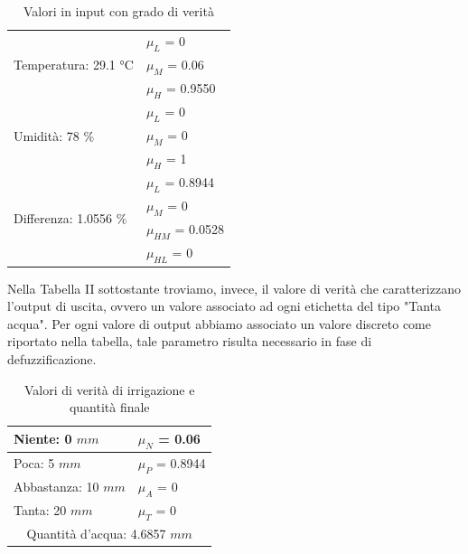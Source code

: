 \documentclass[conference,10pt]{IEEEtran}
\begin{document}
\begin{table}[ht]
	\centering
	\caption{Valori in input con grado di verità}
	{\renewcommand\arraystretch{1.7}
	\begin{tabular}{|l|l|}\hline
		\multirow{3}{*}{Temperatura: 29.1 °C}  & $\mu_{L}$ = 0 \\ \cline{2-2} &  $\mu_{M}$ = 0.06 \\ \cline{2-2}  &  $\mu_{H}$ = 0.9550 \\ \cline{2-2}
		\hline
		\multirow{3}{*}{Umidità: 78 $\%$}  & $\mu_{L}$ = 0 \\ \cline{2-2} &  $\mu_{M}$ = 0 \\ \cline{2-2}  &  $\mu_{H}$ = 1 \\ \cline{2-2}
		\hline
		\multirow{4}{*}{Differenza: 1.0556 $\%$}  & $\mu_{L}$ = 0.8944 \\ \cline{2-2} &  $\mu_{M}$ = 0 \\ \cline{2-2}  &  $\mu_{HM}$ = 0.0528 \\ \cline{2-2} &  $\mu_{HL}$ = 0 \\ \cline{2-2}
		\hline
	\end{tabular}}	
\end{table}
Nella Tabella II sottostante troviamo, invece, il valore di verità che caratterizzano l'output di uscita, ovvero un valore associato ad ogni etichetta del tipo "Tanta acqua".
Per ogni valore di output abbiamo associato un valore discreto come riportato nella tabella, tale parametro risulta necessario in fase di defuzzificazione.\\
\begin{table}[ht]
	\centering
	\caption{Valori di verità di irrigazione e quantità finale}
	{\renewcommand\arraystretch{1.7}
	\begin{tabular}{|l|l|}\hline
		Niente: 0 $mm$  & $\mu_{N}$ = 0.06 \\ \cline{2-2} 
		\hline
		Poca: 5 $mm$ & $\mu_{P}$ = 0.8944 \\ \cline{2-2} 
		\hline
		Abbastanza: 10 $mm$ & $\mu_{A}$ = 0 \\ \cline{2-2} 
		\hline
	    Tanta: 20 $mm$  & $\mu_{T}$ = 0  \\\cline{2-2} 
		\hline
		\multicolumn{2}{|c|}{Quantità d'acqua: 4.6857 $mm$} \\
		\hline		
	\end{tabular}}	
\end{table}

\end{document}
